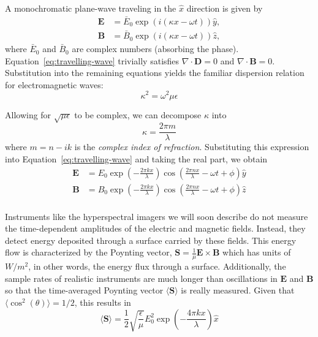 A monochromatic plane-wave traveling in the $\hat{x}$ direction is given by
\begin{equation}\label{eq:travelling-wave}
  \begin{aligned}
    \mathbf{E} &= \bar{E}_0\exp(i(\kappa x - \omega t))\hat{y}, \\
    \mathbf{B} &= \bar{B}_0\exp(i(\kappa x - \omega t))\hat{z},
  \end{aligned}
\end{equation}
where $\bar{E}_0$ and $\bar{B}_0$ are complex numbers
(absorbing the phase). Equation~\ref{eq:travelling-wave} trivially satisfies
$\nabla \cdot \mathbf{D} = 0$ and $\nabla \cdot \mathbf{B} = 0$. Substitution into
the remaining equations yields the familiar dispersion relation for
electromagnetic waves:
\begin{equation}
  \kappa^2 = \omega^2\mu\epsilon
\end{equation}

Allowing for $\sqrt{\mu\epsilon}$ to be complex, we can decompose $\kappa$ into
\begin{equation}
  \kappa = \frac{2\pi m}{\lambda}
\end{equation}
where $m=n - ik$ is the \textit{complex index of refraction}. Substituting this expression
into Equation~\ref{eq:travelling-wave} and taking the real part, we obtain
\begin{equation}\label{eq:wave-real}
  \begin{aligned}
    \mathbf{E} &= E_0\exp\left(-\frac{2\pi k x}{\lambda}\right)\cos\left(  \frac{2\pi n x}{\lambda} - \omega t  + \phi \right) \hat{y} \\
    \mathbf{B} &= B_0\exp\left(-\frac{2\pi k x}{\lambda}\right)\cos\left(  \frac{2\pi n x}{\lambda} - \omega t  + \phi \right) \hat{z} \\
  \end{aligned}
\end{equation}

Instruments like the hyperspectral imagers we will soon describe do not measure
the time-dependent amplitudes of the electric and magnetic fields. Instead, they
detect energy deposited through a surface carried by these fields. This energy
flow is characterized by the Poynting vector, $\mathbf{S} =
\frac{1}{\mu}\mathbf{E}\times\mathbf{B}$ which has units of $W/m^2$, in other
words, the energy flux through a surface. Additionally, the sample rates of realistic
instruments are much longer than oscillations in $\mathbf{E}$ and $\mathbf{B}$ so
that the time-averaged Poynting vector $\langle
\mathbf{S} \rangle$ is really measured. Given that $\langle  \cos^2(\theta) \rangle =
1/2$, this results in
\begin{equation}
  \langle \mathbf{S} \rangle = \frac{1}{2}\sqrt{\frac{\epsilon}{\mu}}E_0^2\exp\left(-\frac{4\pi k x}{\lambda}\right) \hat{x}
\end{equation}

